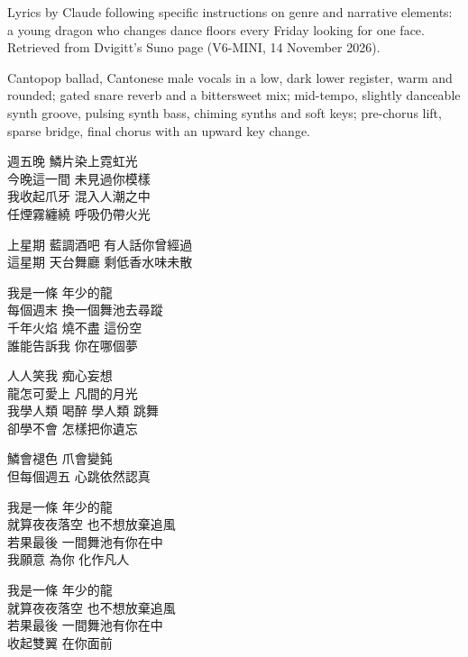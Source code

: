 
\begin{notes}
Lyrics by Claude following specific instructions on genre and narrative elements: a young dragon who changes dance floors every Friday looking for one face. Retrieved from Dvigitt's Suno page (V6-MINI, 14 November 2026).
\end{notes}
\begin{style}
Cantopop ballad, Cantonese male vocals in a low, dark lower register, warm and rounded; gated snare reverb and a bittersweet mix; mid-tempo, slightly danceable synth groove, pulsing synth bass, chiming synths and soft keys; pre-chorus lift, sparse bridge, final chorus with an upward key change.
\end{style}
\begin{lyrics}
\begin{chinese}
週五晚 鱗片染上霓虹光\\
今晚這一間 未見過你模樣\\
我收起爪牙 混入人潮之中\\
任煙霧纏繞 呼吸仍帶火光
\end{chinese}

\begin{chinese}
上星期 藍調酒吧 有人話你曾經過\\
這星期 天台舞廳 剩低香水味未散
\end{chinese}

\begin{chinese}
我是一條 年少的龍\\
每個週末 換一個舞池去尋蹤\\
千年火焰 燒不盡 這份空\\
誰能告訴我 你在哪個夢
\end{chinese}

\begin{chinese}
人人笑我 痴心妄想\\
龍怎可愛上 凡間的月光\\
我學人類 喝醉 學人類 跳舞\\
卻學不會 怎樣把你遺忘
\end{chinese}

\begin{chinese}
鱗會褪色 爪會變鈍\\
但每個週五 心跳依然認真
\end{chinese}

\begin{chinese}
我是一條 年少的龍\\
就算夜夜落空 也不想放棄追風\\
若果最後 一間舞池有你在中\\
我願意 為你 化作凡人

我是一條 年少的龍\\
就算夜夜落空 也不想放棄追風\\
若果最後 一間舞池有你在中\\
收起雙翼 在你面前
\end{chinese}
\end{lyrics}

